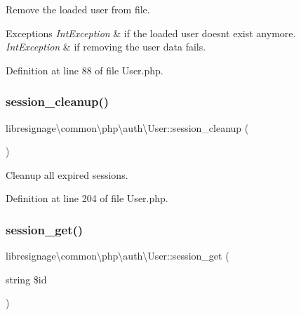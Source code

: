 Remove the loaded user from file.


\begin{DoxyExceptions}{Exceptions}
{\em Int\+Exception} & if the loaded user doesn\textquotesingle{}t exist anymore. \\
\hline
{\em Int\+Exception} & if removing the user data fails. \\
\hline
\end{DoxyExceptions}


Definition at line 88 of file User.\+php.

\mbox{\label{classlibresignage_1_1common_1_1php_1_1auth_1_1User_a87f9e6639bbe95bb89cfa6996e587792}} 
\subsubsection{\texorpdfstring{session\+\_\+cleanup()}{session\_cleanup()}}
{\footnotesize\ttfamily libresignage\textbackslash{}common\textbackslash{}php\textbackslash{}auth\textbackslash{}\+User\+::session\+\_\+cleanup (\begin{DoxyParamCaption}{ }\end{DoxyParamCaption})\hspace{0.3cm}{\ttfamily [private]}}

Cleanup all expired sessions. 

Definition at line 204 of file User.\+php.

\mbox{\label{classlibresignage_1_1common_1_1php_1_1auth_1_1User_a0bebd7aa87fafd09205aee203ac18df5}} 
\subsubsection{\texorpdfstring{session\+\_\+get()}{session\_get()}}
{\footnotesize\ttfamily libresignage\textbackslash{}common\textbackslash{}php\textbackslash{}auth\textbackslash{}\+User\+::session\+\_\+get (\begin{DoxyParamCaption}\item[{string}]{\$id }\end{DoxyParamCaption})}

